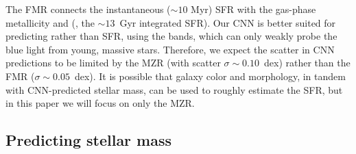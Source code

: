 \documentclass[fleqn,usenatbib]{mnras}
\begin{document}
The FMR connects the instantaneous ($\sim 10$ Myr) SFR with the gas-phase metallicity \citep[$\sim 1$~Gyr timescales; see, e.g.,][]{2011ApJ...734...48L} and \mstar{} (\ie, the $\sim 13$~Gyr integrated SFR). Our CNN is better suited for predicting \mstar{} rather than SFR, using the \sdssg\sdssr\sdssi bands, which can only weakly probe the blue light from young, massive stars. Therefore, we expect the scatter in CNN predictions to be limited by the MZR (with scatter $\sigma \sim 0.10$~dex) rather than the FMR ($\sigma \sim 0.05$~dex). It is possible that galaxy color and morphology, in tandem with CNN-predicted stellar mass, can be used to roughly estimate the SFR, but in this paper we will focus on only the MZR.


\subsection{Predicting stellar mass}
\end{document}
